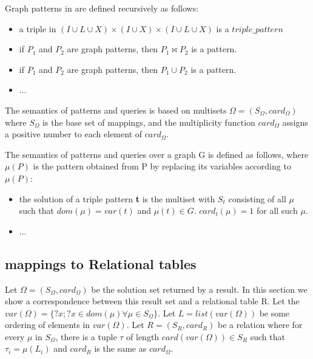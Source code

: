Graph patterns in \sparql are defined recursively as follows: %
\begin{itemize}
    \item a triple in $(I \cup L \cup X) \times (I \cup X) \times (I \cup L \cup X)$ is a $triple\_pattern$
    \item if $P_1$ and $P_2$ are graph patterns, then $ P_1\Join P_2$ is a pattern.
    \item if $P_1$ and $P_2$ are graph patterns, then $ P_1\cup P_2$ is a pattern.
    \item ...
\end{itemize}
The semantics of patterns and queries is based on multisets $\Omega = (S_{\Omega}, card_{\Omega})$ where $S_{\Omega}$ is the base set of mappings, and the multiplicity function $card_{\Omega}$ assigns a positive number to each element of $card_{\Omega}$.


The semantics of patterns and queries over a graph G is defined as follows, where $\mu(P)$ is the pattern obtained from P by replacing its variables according to $\mu(P)$:
\begin{itemize}
    \item the solution of a triple pattern \textbf{t} is the multiset with $S_t$ consisting of all $\mu$ such that $dom(\mu) = var(t)$ and $\mu(t) \in G$. $card_t(\mu) = 1$ for all such $\mu$.
    \item ...
\end{itemize}

\subsection{\sparql mappings to Relational tables}
Let $\Omega = (S_{\Omega}, card_{\Omega})$ be the solution set returned by a \sparql result. In this section we show a correspondence between this result set and a relational table R. Let the $var(\Omega) = \{?x; ?x \in dom(\mu) \forall \mu \in S_{\Omega} \}$.  Let $L = list(var(\Omega))$ be some ordering of elements in $var(\Omega)$. Let $R = (S_R, card_R)$ be a relation where for every $\mu$ in $S_{\Omega}$, there is a tuple $\tau$ of length $card(var(\Omega)) \in S_R$ such that $\tau_i = \mu(L_i)$ and $card_R$ is the same as $card_{\Omega}$.
 

